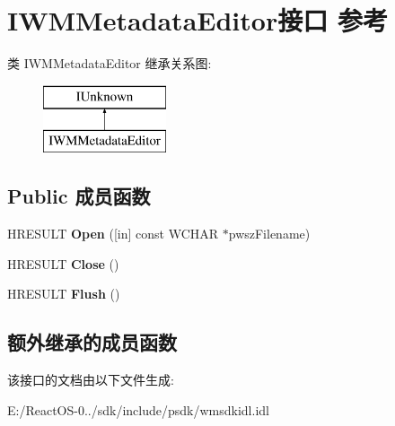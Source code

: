 \hypertarget{interface_i_w_m_metadata_editor}{}\section{I\+W\+M\+Metadata\+Editor接口 参考}
\label{interface_i_w_m_metadata_editor}
类 I\+W\+M\+Metadata\+Editor 继承关系图\+:\begin{figure}[H]
\begin{center}
\leavevmode
\includegraphics[height=2.000000cm]{interface_i_w_m_metadata_editor}
\end{center}
\end{figure}
\subsection*{Public 成员函数}
\begin{DoxyCompactItemize}
\item 
\mbox{\label{interface_i_w_m_metadata_editor_a3ce2997285ee4452b54dc27b0bd3d300}} 
H\+R\+E\+S\+U\+LT {\bfseries Open} (\mbox{[}in\mbox{]} const W\+C\+H\+AR $\ast$pwsz\+Filename)
\item 
\mbox{\label{interface_i_w_m_metadata_editor_aaa5696241b2de45986b13088966f17ed}} 
H\+R\+E\+S\+U\+LT {\bfseries Close} ()
\item 
\mbox{\label{interface_i_w_m_metadata_editor_ae26e3637bc714ac7eb0757fde13690b1}} 
H\+R\+E\+S\+U\+LT {\bfseries Flush} ()
\end{DoxyCompactItemize}
\subsection*{额外继承的成员函数}


该接口的文档由以下文件生成\+:\begin{DoxyCompactItemize}
\item 
E\+:/\+React\+O\+S-\/0../sdk/include/psdk/wmsdkidl.\+idl\end{DoxyCompactItemize}
